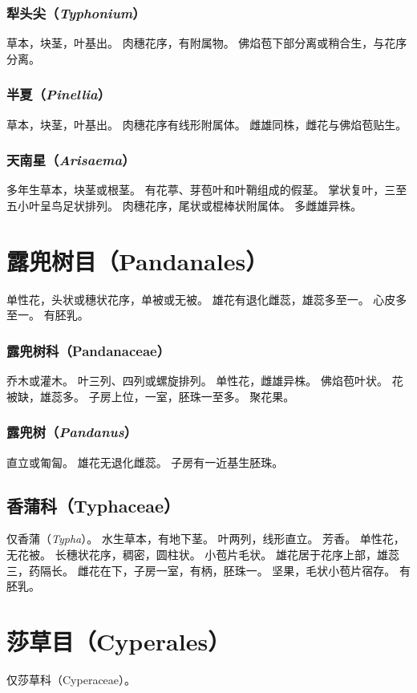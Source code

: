 \documentclass[11pt]{article}
\begin{document}
\begin{sloppypar}
\subsubsection{犁头尖（\textit{Typhonium}）}
草本，块茎，叶基出。
肉穗花序，有附属物。
佛焰苞下部分离或稍合生，与花序分离。

\subsubsection{半夏（\textit{Pinellia}）}
草本，块茎，叶基出。
肉穗花序有线形附属体。
雌雄同株，雌花与佛焰苞贴生。

\subsubsection{天南星（\textit{Arisaema}）}
多年生草本，块茎或根茎。
有花葶、芽苞叶和叶鞘组成的假茎。
掌状复叶，三至五小叶呈鸟足状排列。
肉穗花序，尾状或棍棒状附属体。
多雌雄异株。

\section{露兜树目（Pandanales）}
单性花，头状或穗状花序，单被或无被。
雄花有退化雌蕊，雄蕊多至一。
心皮多至一。
有胚乳。

\subsubsection{露兜树科（Pandanaceae）}
乔木或灌木。
叶三列、四列或螺旋排列。
单性花，雌雄异株。
佛焰苞叶状。
花被缺，雄蕊多。
子房上位，一室，胚珠一至多。
聚花果。

\subsubsection{露兜树（\textit{Pandanus}）}
直立或匍匐。
雄花无退化雌蕊。
子房有一近基生胚珠。

\subsection{香蒲科（Typhaceae）}
仅香蒲（\textit{Typha}）。
水生草本，有地下茎。
叶两列，线形直立。
芳香。
单性花，无花被。
长穗状花序，稠密，圆柱状。
小苞片毛状。
雄花居于花序上部，雄蕊三，药隔长。
雌花在下，子房一室，有柄，胚珠一。
坚果，毛状小苞片宿存。
有胚乳。

\section{莎草目（Cyperales）}
仅莎草科（Cyperaceae）。


\end{sloppypar}
\end{document}

